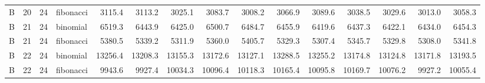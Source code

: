 \begin{tabular}{ccclrrrrrrrrrrr}
B & 20 & 24 & fibonacci & 3115.4 & 3113.2 & 3025.1 & 3083.7 & 3008.2 & 3066.9 & 3089.6 & 3038.5 & 3029.6 & 3013.0 & 3058.3 \\
B & 21 & 24 & binomial & 6519.3 & 6443.9 & 6425.0 & 6500.7 & 6484.7 & 6455.9 & 6419.6 & 6437.3 & 6422.1 & 6434.0 & 6454.3 \\
B & 21 & 24 & fibonacci & 5380.5 & 5339.2 & 5311.9 & 5360.0 & 5405.7 & 5329.3 & 5307.4 & 5345.7 & 5329.8 & 5308.0 & 5341.8 \\
B & 22 & 24 & binomial & 13256.4 & 13208.3 & 13155.3 & 13172.6 & 13127.1 & 13288.5 & 13255.2 & 13174.8 & 13124.8 & 13171.8 & 13193.5 \\
B & 22 & 24 & fibonacci & 9943.6 & 9927.4 & 10034.3 & 10096.4 & 10118.3 & 10165.4 & 10095.8 & 10169.7 & 10076.2 & 9927.2 & 10055.4 \\
\hline
\end{tabular}
